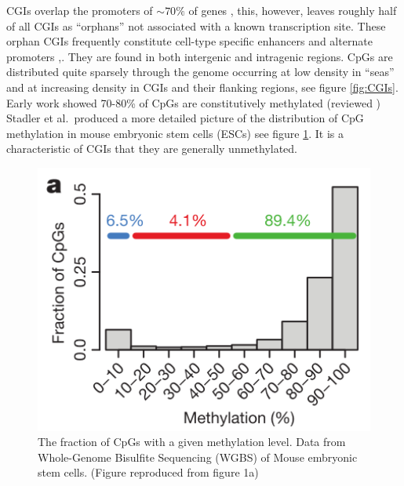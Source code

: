 \documentclass[]{book}
\begin{document}
CGIs overlap the promoters of \(\sim70\%\) of genes \citep{Saxonov2006}, this, however, leaves roughly half of all CGIs as ``orphans'' not associated with a known transcription site. These orphan CGIs frequently constitute cell-type specific enhancers \citep{Bell2017} and alternate promoters \citep{Illingworth2010},\citep{Maunakea2010}. They are found in both intergenic and intragenic regions. CpGs are distributed quite sparsely through the genome occurring at low density in ``seas'' and at increasing density in CGIs and their flanking regions, see figure \ref{fig:CGIs}. Early work showed 70-80\% of CpGs are constitutively methylated \citep{Ehrlich1982} (reviewed \citet{Bird2002}) Stadler et al.~produced a more detailed picture of the distribution of CpG methylation in mouse embryonic stem cells (ESCs) \citep{Stadler2011} see figure \ref{fig:CpGfreqVsDNAm}. It is a characteristic of CGIs that they are generally unmethylated.

\begin{figure}
\includegraphics[width=5.81in]{figs/CpGfreqVsDNAm} \caption{The fraction of CpGs with a given methylation level. Data from Whole-Genome Bisulfite Sequencing (WGBS) of Mouse embryonic stem cells. (Figure reproduced from \citet{Stadler2011} figure 1a)}\label{fig:CpGfreqVsDNAm}
\end{figure}
\end{document}
